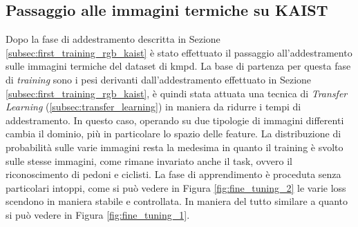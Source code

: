 \subsection{Passaggio alle immagini termiche su KAIST}
Dopo la fase di addestramento descritta in Sezione \ref{subsec:first_training_rgb_kaist} è stato effettuato il passaggio all'addestramento sulle immagini termiche del dataset di \ac{kmpd}. La base di partenza per questa fase di \textit{training} sono i pesi derivanti dall'addestramento effettuato in Sezione \ref{subsec:first_training_rgb_kaist}, è quindi stata attuata una tecnica di \textit{Transfer Learning} (\ref{subsec:transfer_learning}) in maniera da ridurre i tempi di addestramento. In questo caso, operando su due tipologie di immagini differenti cambia il dominio, più in particolare lo spazio delle feature. La distribuzione di probabilità sulle varie immagini resta la medesima in quanto il training è svolto sulle stesse immagini, come rimane invariato anche il task, ovvero il riconoscimento di pedoni e ciclisti.
La fase di apprendimento è proceduta senza particolari intoppi, come si può vedere in Figura \ref{fig:fine_tuning_2} le varie loss scendono in maniera stabile e controllata. In maniera del tutto similare a quanto si può vedere in Figura \ref{fig:fine_tuning_1}.

